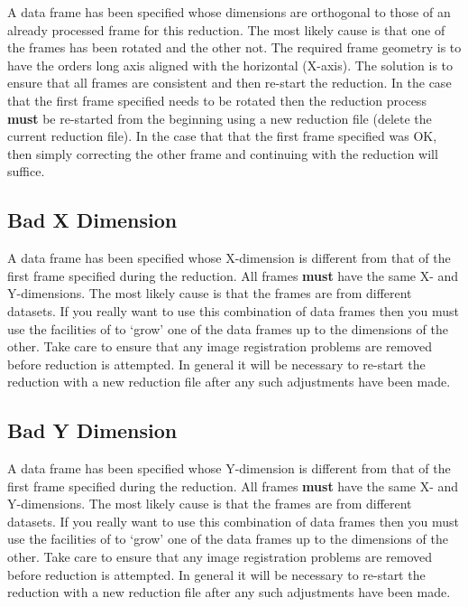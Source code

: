 A data frame has been specified whose dimensions are orthogonal to those
of an already processed frame for this reduction. The most likely cause
is that one of the frames has been rotated and the other not. The
required frame geometry is to have the orders long axis aligned with the
horizontal (X-axis). The solution is to ensure that all
frames are consistent  and then re-start the reduction. In the case that
the first frame specified needs to be rotated then the reduction process
{\bf must} be re-started from the beginning using a new reduction file (delete
the current reduction file). In the case that that the first frame
specified was OK, then simply correcting the other frame and continuing
with the reduction will suffice.

\subsection{ Bad X Dimension}

A data frame has been specified whose X-dimension is different from that
of the first frame specified during the reduction. All frames {\bf must} have
the same X- and Y-dimensions. The most likely cause is that the frames
are from different datasets. If you really want to use this combination
of data frames then you must use the facilities of 
to `grow' one
of the data frames up to the dimensions of the other.
Take care to ensure that any image registration problems are removed
before reduction is attempted.
In general it will be necessary to re-start the reduction with a new
reduction file after any such adjustments have been made.

\subsection{ Bad Y Dimension}

A data frame has been specified whose Y-dimension is different from that
of the first frame specified during the reduction. All frames {\bf must} have
the same X- and Y-dimensions. The most likely cause is that the frames
are from different datasets. If you really want to use this combination
of data frames then you must use the facilities of 
to `grow' one
of the data frames up to the dimensions of the other.
Take care to ensure that any image registration problems are removed
before reduction is attempted.
In general it will be necessary to re-start the reduction with a new
reduction file after any such adjustments have been made.

